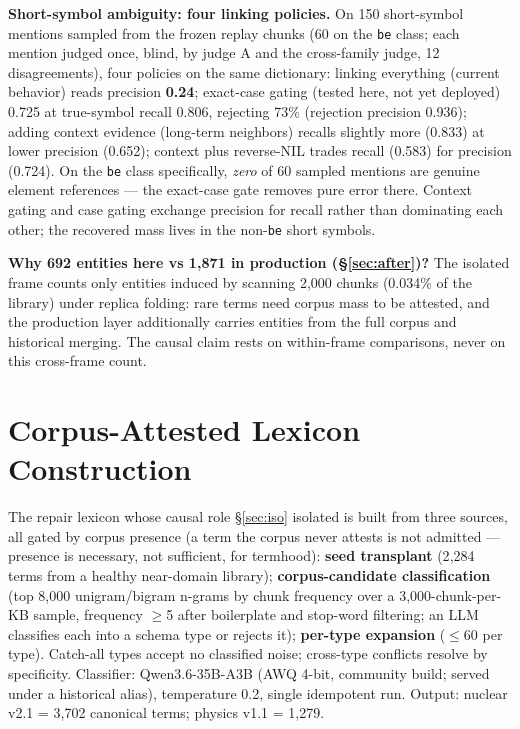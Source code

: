\documentclass[sigconf,nonacm,anonymous]{acmart}
\begin{document}
\textbf{Short-symbol ambiguity: four linking policies.} On 150
short-symbol mentions sampled from the frozen replay chunks (60 on
the \texttt{be} class; each mention judged once, blind, by judge A
and the cross-family judge, 12 disagreements), four policies on the
same dictionary: linking everything (current behavior) reads
precision \textbf{0.24}; exact-case gating (tested here, not yet deployed)
0.725 at true-symbol recall 0.806, rejecting 73\% (rejection
precision 0.936); adding context evidence (long-term neighbors)
recalls slightly more (0.833) at lower precision (0.652); context
plus reverse-NIL trades recall (0.583) for precision (0.724). On the
\texttt{be} class specifically, \emph{zero} of 60 sampled mentions
are genuine element references --- the exact-case gate removes pure
error there. Context gating and case gating exchange precision for
recall rather than dominating each other; the recovered mass lives
in the non-\texttt{be} short symbols.

\textbf{Why 692 entities here vs 1{,}871 in production
(\S\ref{sec:after})?} The isolated frame counts only entities induced
by scanning 2{,}000 chunks (0.034\% of the library) under replica
folding: rare terms need corpus mass to be attested, and the production
layer additionally carries entities from the full corpus and historical
merging. The causal claim rests on within-frame comparisons, never on
this cross-frame count.

\section{Corpus-Attested Lexicon Construction}\label{sec:lexicon}

The repair lexicon whose causal role \S\ref{sec:iso} isolated is built
from three sources, all gated by corpus presence (a term the corpus
never attests is not admitted --- presence is necessary, not sufficient,
for termhood): \textbf{seed transplant} (2{,}284 terms from a healthy
near-domain library); \textbf{corpus-candidate classification} (top
8{,}000 unigram/bigram n-grams by chunk frequency over a
3{,}000-chunk-per-KB sample, frequency $\geq$5 after boilerplate and
stop-word filtering; an LLM classifies each into a schema type or
rejects it); \textbf{per-type expansion} ($\leq$60 per type). Catch-all
types accept no classified noise; cross-type conflicts resolve by
specificity. Classifier: Qwen3.6-35B-A3B (AWQ 4-bit, community build;
served under a historical alias), temperature 0.2, single idempotent
run. Output: nuclear v2.1 = 3{,}702 canonical terms; physics v1.1 =
1{,}279.
\end{document}
